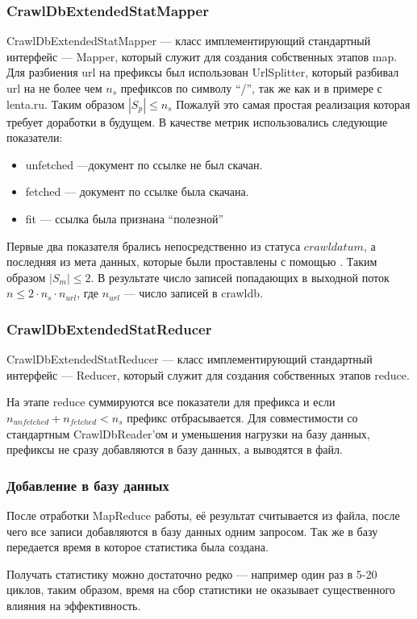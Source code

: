 \subsubsection{CrawlDbExtendedStatMapper}
CrawlDbExtendedStatMapper --- класс имплементирующий стандартный интерфейс  --- Mapper, который служит для создания собственных этапов map.
Для разбиения url на префиксы был использован UrlSplitter, который разбивал url на не более чем $n_{s}$ префиксов по символу ``/'', так же как и в примере с lenta.ru. Таким образом $|S_{p}|\leqslant n_{s}$ Пожалуй это самая простая реализация которая требует доработки в будущем.
В качестве метрик использовались следующие показатели:
\begin{itemize}
 \item unfetched ---документ по ссылке не был скачан.
 \item fetched --- документ по ссылке была скачана.
 \item fit --- ссылка была признана ``полезной''
\end{itemize}
Первые два показателя брались непосредственно из статуса $crawldatum$, а последняя из мета данных, которые были проставлены с помощью . Таким образом $|S_{m}|\leqslant2$. В результате число записей попадающих в выходной поток $n\leqslant 2\cdot n_{s}\cdot n_{url}$, где $n_{url}$ --- число записей в crawldb.

\subsubsection{CrawlDbExtendedStatReducer}
CrawlDbExtendedStatReducer --- класс имплементирующий стандартный интерфейс  --- Reducer, который служит для создания собственных этапов reduce.

На этапе reduce суммируются все показатели для префикса и если $n_{unfetched}+n_{fetched} < n_{s}$ префикс отбрасывается. Для совместимости со стандартным CrawlDbReader'ом и уменьшения нагрузки на базу данных, префиксы не сразу добавляются в базу данных, а выводятся в файл. 
\subsubsection{Добавление в базу данных}
После отработки MapReduce работы, её результат считывается из файла, после чего все записи добавляются в базу данных одним запросом. Так же в базу передается время в которое статистика была создана.

Получать статистику можно достаточно редко --- например один раз в 5-20 циклов, таким образом, время на сбор статистики не оказывает существенного влияния на эффективность.
